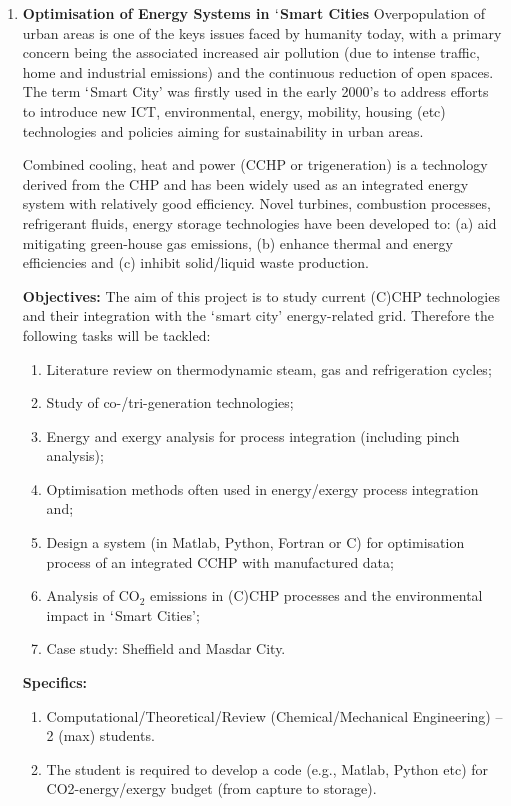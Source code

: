 \documentclass[12pts,a4paper,amsmath,amssymb,floatfix]{article}%
\begin{document}
\begin{enumerate}[label=\bfseries Project \arabic*:]
\clearpage

\item {\bf Optimisation of Energy Systems in $\lq$Smart Cities}
Overpopulation of urban areas is one of the keys issues faced by humanity today, with a primary concern being the associated increased air pollution (due to intense traffic, home and industrial emissions) and the continuous reduction of open spaces. The term $\lq$Smart City’ was firstly used  in the early 2000’s to address efforts to introduce new ICT, environmental, energy, mobility, housing (etc) technologies and policies aiming for sustainability in urban areas.

Combined cooling, heat and power (CCHP or trigeneration) is a technology derived from the CHP and has been widely used as an integrated energy system with relatively good efficiency. Novel turbines, combustion processes, refrigerant fluids, energy storage technologies have been developed to: (a) aid mitigating green-house gas emissions, (b) enhance thermal and energy efficiencies and (c) inhibit solid/liquid waste production.

\noindent
{\bf Objectives:} The aim of this project is to study current (C)CHP technologies and their integration with the $\lq$smart city’ energy-related grid. Therefore the following tasks will be tackled:
\begin{enumerate}
\item Literature review on thermodynamic steam, gas and refrigeration cycles;
\item Study of co-/tri-generation technologies;
\item Energy and exergy analysis for process integration (including pinch analysis);
\item Optimisation methods often used in energy/exergy process integration and;
\item Design a system (in Matlab, Python, Fortran or C) for optimisation process of an integrated CCHP with manufactured data;
\item Analysis of CO$_{2}$ emissions in (C)CHP processes and the environmental impact in $\lq$Smart Cities';
\item Case study: Sheffield and Masdar City.
\end{enumerate}


\noindent
{\bf Specifics:} 
\begin{enumerate}
\item Computational/Theoretical/Review (Chemical/Mechanical Engineering) -- 2 (max) students. 
\item The student is required to develop a code (e.g., Matlab, Python etc) for CO2-energy/exergy budget (from capture to storage).
\end{enumerate} 


\end{enumerate}
\end{document}

